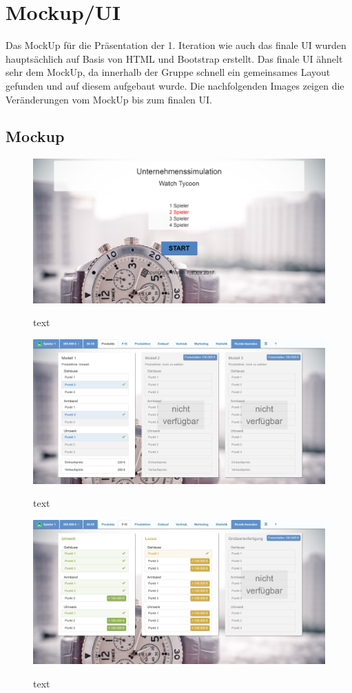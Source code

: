 \chapter{Mockup/UI}
Das MockUp für die Präsentation der 1. Iteration wie auch das finale UI wurden hauptsächlich auf Basis von HTML und Bootstrap erstellt. Das finale UI ähnelt sehr dem MockUp, da innerhalb der Gruppe schnell ein gemeinsames Layout gefunden und auf diesem aufgebaut wurde. Die nachfolgenden Images zeigen die Veränderungen vom MockUp bis zum finalen UI.  
\section{Mockup}
\begin{figure} [h]
	\centering
	\includegraphics[scale=0.1]{img/bilder_layout/MockUp1.jpg}
	\label{key}
	\caption{text} 
\end{figure}
\begin{figure}
	\centering
	\includegraphics[scale=0.1]{img/bilder_layout/MockUp2.jpg}
	\label{key}
	\caption{text} 
\end{figure}
\begin{figure} 
	\centering
	\includegraphics[scale=0.1]{img/bilder_layout/MockUp3.jpg}
	\label{key}
	\caption{text} 
\end{figure}
